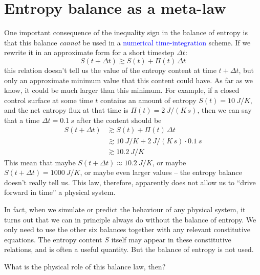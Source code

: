 \documentclass[a4paper,12pt,%
onecolumn,oneside,%
british%
]{memoir}
\newcommand*{\incr}{\Delta}%
\renewcommand*{\|}[1][]{\nonscript\:#1\vert\nonscript\:\mathopen{}}
\newcommand*{\sect}{\S}%
\renewcommand*{\autoref}[3][\sect\,\ref]{\textcolor{blue}{#3}
\raisebox{0.6ex}{\color{blue}\miniscule%
\faIcon{angle-right}%
\;#1{#2}\;p.\,\pageref{#2}}}
\newcommand*{\Dt}{\incr t}
\newcommand*{\yS}{S}
\newcommand*{\yB}{\varPi}
\begin{document}
\section{Entropy balance as a meta-law}
\label{sec:entropy_metalaw}

One important consequence of the inequality sign in the balance of entropy is that this balance \emph{cannot} be used in a \autoref{sec:numeric_simulation}{numerical time-integration} scheme. If we rewrite it in an approximate form for a short timestep $\Dt$:
\begin{equation*}
  \yS(t+\Dt) \gtrsim \yS(t) + \yB(t)\,\Dt
\end{equation*}
this relation doesn't tell us the value of the entropy content at time $t+\Dt$, but only an approximate minimum value that this content could have. As far as we know, it could be much larger than this minimum. For example, if a closed control surface at some time $t$ contains an amount of entropy $\yS(t) = \qty{10}{J/K}$, and the net entropy flux at that time is $\yB(t) = \qty{2}{J/(K\,s)}$, then we can say that a time $\Dt=\qty{0.1}{s}$ after the content should be
\begin{equation*}
  \begin{aligned}
    \yS(t+\Dt) &\gtrsim \yS(t) + \yB(t)\,\Dt\\
    &\gtrsim \qty{10}{J/K} + \qty{2}{J/(K\,s)}\cdot\qty{0.1}{s}\\
    &\gtrsim \qty{10.2}{J/K}
  \end{aligned}
\end{equation*}
This mean that maybe $\yS(t+\Dt) \approx \qty{10.2}{J/K}$, or maybe $\yS(t+\Dt)=\qty{1000}{J/K}$, or maybe even larger values -- the entropy balance doesn't really tell us. This law, therefore, apparently does not allow us to \enquote{drive forward in time} a physical system.

In fact, when we simulate or predict the behaviour of any physical system, it turns out that we can in principle always do without the balance of entropy. We only need to use the other six balances together with any relevant constitutive equations. The entropy content $\yS$ itself may appear in these constitutive relations, and is often a useful quantity. But the balance of entropy is not used.

What is the physical role of this balance law, then?

\medskip
\end{document}
